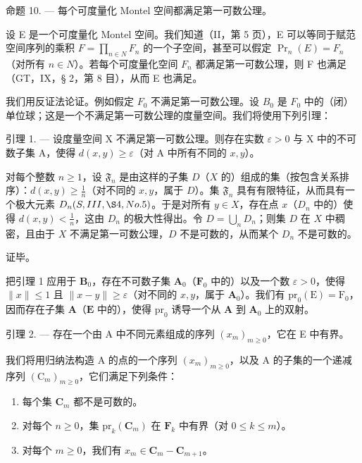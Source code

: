 命题 10. --- 每个可度量化 Montel 空间都满足第一可数公理。

设 E 是一个可度量化 Montel 空间。我们知道（II，第 5 页），E 可以等同于赋范空间序列的乘积 \(F = \prod_{n \in N} F_n\) 的一个子空间，甚至可以假定 \(\Pr_n(E) = F_n\)（对所有 \(n \in N\)）。若每个可度量化空间 \(F_n\) 都满足第一可数公理，则 F 也满足（GT，IX，§ 2，第 8 目），从而 E 也满足。

我们用反证法论证。例如假定 \(F_{0}\) 不满足第一可数公理。设 \(B_{0}\) 是 \(F_{0}\) 中的（闭）单位球；这是一个不满足第一可数公理的度量空间。我们将使用下列引理：

引理 1. --- 设度量空间 X 不满足第一可数公理。则存在实数 \(\varepsilon > 0\) 与 X 中的不可数子集 A，使得 \(d(x, y) \geqslant \varepsilon\)（对 A 中所有不同的 \(x, y\)）。

对每个整数 \(n \geqslant 1\)，设 \(\mathfrak{F}_n\) 是由这样的子集 \(D\)（\(X\) 的）组成的集（按包含关系排序）：\(d(x, y) \geqslant \frac{1}{n}\)（对不同的 \(x, y\)，属于 \(D\)）。集 \(\mathfrak{F}_n\) 具有有限特征，从而具有一个极大元素 \(D_n(S, III, \S 4, No. 5)\)。于是对所有 \(y \in X\)，存在点 \(x\)（\(D_n\) 中的）使得 \(d(x, y) < \frac{1}{n}\)，这由 \(D_n\) 的极大性得出。令 \(D = \bigcup_{n} D_n\)；则集 \(D\) 在 \(X\) 中稠密，且由于 \(X\) 不满足第一可数公理，\(D\) 不是可数的，从而某个 \(D_n\) 不是可数的。

证毕。

把引理 1 应用于 \(\mathbf{B}_0\)，存在不可数子集 \(\mathbf{A}_0\)（\(\mathbf{F}_0\) 中的）以及一个数 \(\varepsilon > 0\)，使得 \(\| x \| \leqslant 1\) 且 \(\| x - y \| \geqslant \varepsilon\)（对不同的 \(x, y\)，属于 \(\mathbf{A}_0\)）。我们有 \(\mathrm{pr}_0(\mathrm{E}) = \mathrm{F}_0\)，因而存在子集 \(\mathbf{A}\)（\(\mathbf{E}\) 中的），使得 \(\mathrm{pr}_0\) 诱导一个从 \(\mathbf{A}\) 到 \(\mathbf{A}_0\) 上的双射。

引理 2. --- 存在一个由 A 中不同元素组成的序列 \((x_{m})_{m\geqslant 0}\)，它在 E 中有界。

我们将用归纳法构造 A 的点的一个序列 \((x_{m})_{m\geqslant 0}\)，以及 A 的子集的一个递减序列 \((\mathrm{C}_m)_{m\geqslant 0}\)，它们满足下列条件：

\begin{enumerate}
\def\labelenumi{\alph{enumi})}
\item
  每个集 \(\mathbf{C}_m\) 都不是可数的。
\item
  对每个 \(n \geqslant 0\)，集 \(\mathrm{pr}_k(\mathbf{C}_m)\) 在 \(\mathbf{F}_k\) 中有界（对 \(0 \leqslant k \leqslant m\)）。
\item
  对每个 \(m \geqslant 0\)，我们有 \(x_{m} \in \mathbf{C}_{m} - \mathbf{C}_{m+1}\)。
\end{enumerate}

